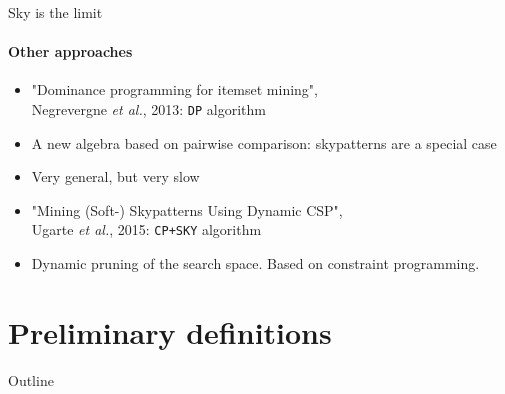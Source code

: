 \documentclass{beamer}
\newcommand{\etal}{\emph{et al.}}
\newcommand{\domp}{\texttt{DP}}
\newcommand{\cpsky}{\texttt{CP+SKY}}
\begin{document}
\begin{frame}{Sky is the limit}
  \framesubtitle{Other approaches}
  \begin{itemize}
  \item "Dominance programming for itemset mining", \\Negrevergne \etal{}, 2013: \domp{} algorithm
  \item A new algebra based on pairwise comparison: skypatterns are a special case
  \item Very general, but very slow
  \end{itemize}
  \begin{itemize}
  \pause
  \item "Mining (Soft-) Skypatterns Using Dynamic CSP", \\Ugarte \etal{}, 2015: \cpsky{} algorithm
  \item Dynamic pruning of the search space. Based on constraint programming.
  \end{itemize}
\end{frame}

\section{Preliminary definitions}
\begin{frame}{Outline}
  \tableofcontents[currentsection]
\end{frame}
\end{document}
